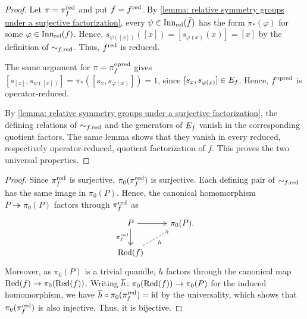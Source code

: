 \begin{proof}
    Let $\pi=\pi_{f}^{\mathrm{red}}$ and put $\bar f=f^{\mathrm{red}}$. By \cref{lemma: relative symmetry groups under a surjective factorization}, every $\psi\in\operatorname{Inn_{rel}}(\bar f)$ has the form $\pi_*(\varphi)$ for some $\varphi\in\operatorname{Inn_{rel}}(f)$. Hence, $s_{\psi([x])}([x])=[s_{\varphi(x)}(x)]=[x]$ by the definition of $\sim_{f, \mathrm{red}}$. Thus, $f^{\mathrm{red}}$ is reduced.

    The same argument for $\pi=\pi_{f}^{\mathrm{opred}}$ gives $[s_{[x]},s_{\psi([x])}] =\pi_*([s_x,s_{\varphi(x)}])=1$, since $[s_x,s_{\varphi(x)}]\in E_{f}$. Hence, $f^{\mathrm{opred}}$ is operator-reduced.

    By \cref{lemma: relative symmetry groups under a surjective factorization}, the defining relations of $\sim_{f, \mathrm{red}}$ and the generators of $E_{f}$ vanish in the corresponding quotient factors. The same lemma shows that they vanish in every reduced, respectively operator-reduced, quotient factorization of $f$. This proves the two universal properties. 
\end{proof}



\begin{proof}
Since $\pi_{f}^{\mathrm{red}}$ is surjective, $\pi_0(\pi_{f}^{\mathrm{red}})$ is surjective.
Each defining pair of $\sim_{f, \mathrm{red}}$ has the same image in $\pi_0(P)$. Hence, the canonical homomorphism $P\twoheadrightarrow\pi_0(P)$ factors through $\pi_{f}^{\mathrm{red}}$ as
\[\begin{tikzcd}
    P \arrow[two heads]{r} \arrow[two heads]{d}[swap]{\redMap{f}} & \pi_0(P)\rlap{.} \\
    \redQuot{f} \arrow[dashed]{ru}[swap]{h}
\end{tikzcd}\]
Moreover, as $\pi_0(P)$ is a trivial quandle, $h$ factors through the canonical map $\operatorname{Red}(f) \to \pi_0(\operatorname{Red}(f))$. Writing $\overline{h}\colon \pi_0(\operatorname{Red}(f)) \to \pi_0(P)$ for the induced homomorphism, we have $\overline{h}\circ \pi_0(\pi_{f}^{\mathrm{red}}) = \operatorname{id}$ by the universality, which shows that $\pi_0(\pi_{f}^{\mathrm{red}})$ is also injective.
Thus, it is bijective.
\end{proof}


